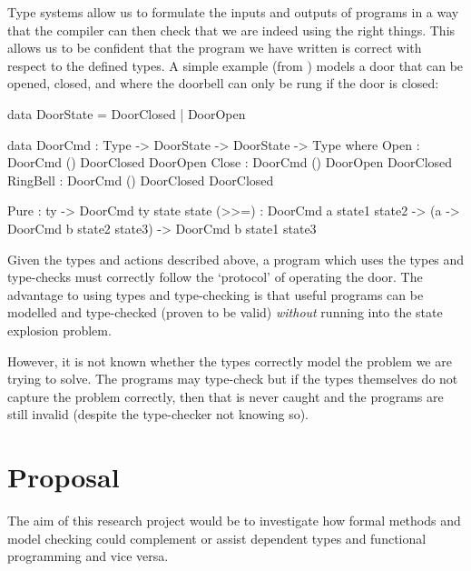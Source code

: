 \documentclass[11pt]{article}
\begin{document}
    Type systems allow us to formulate the inputs and outputs of programs in a
    way that the compiler can then check that we are indeed using the right
    things. This allows us to be confident that the program we have written is
    correct with respect to the defined types. A simple example (from
    \cite{brady_type-driven_2017}) models a door that can be opened, closed, and
    where the doorbell can only be rung if the door is closed:
    \begin{idrislisting}
data DoorState = DoorClosed | DoorOpen

data DoorCmd : Type -> DoorState -> DoorState -> Type
  where
    Open : DoorCmd     () DoorClosed DoorOpen
    Close : DoorCmd    () DoorOpen DoorClosed
    RingBell : DoorCmd () DoorClosed DoorClosed
    
    Pure : ty -> DoorCmd ty state state
    (>>=) : DoorCmd a state1 state2 ->
            (a -> DoorCmd b state2 state3) ->
            DoorCmd b state1 state3
    \end{idrislisting}
    Given the types and actions described above, a program which uses the types
    and type-checks must correctly follow the `protocol' of operating the door.
    The advantage to using types and type-checking is that useful programs can
    be modelled and type-checked (proven to be valid) \textit{without}
    running into the state explosion problem.
    
    However, it is not known whether the types correctly model the problem we
    are trying to solve. The programs may type-check but if the types themselves
    do not capture the problem correctly, then that is never caught and the
    programs are still invalid (despite the type-checker not knowing so).
    
    \section*{Proposal}
    The aim of this research project would be to investigate how formal methods
    and model checking could complement or assist dependent types and
    functional programming and vice versa.
    
\end{document}
